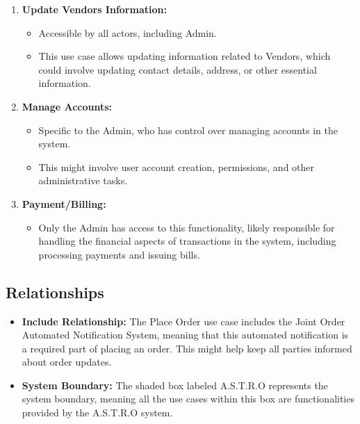\begin{enumerate}
    \item \textbf{Update Vendors Information:}
          \begin{itemize}
              \item Accessible by all actors, including Admin.
              \item This use case allows updating information related to Vendors, which could involve updating contact details, address, or other essential information.
          \end{itemize}

    \item \textbf{Manage Accounts:}
          \begin{itemize}
              \item Specific to the Admin, who has control over managing accounts in the system.
              \item This might involve user account creation, permissions, and other administrative tasks.
          \end{itemize}

    \item \textbf{Payment/Billing:}
          \begin{itemize}
              \item Only the Admin has access to this functionality, likely responsible for handling the financial aspects of transactions in the system, including processing payments and issuing bills.
          \end{itemize}
\end{enumerate}
\subsection{Relationships}

\begin{itemize}
    \item \textbf{Include Relationship:}
          The Place Order use case includes the Joint Order Automated Notification System, meaning that this automated notification is a required part of placing an order. This might help keep all parties informed about order updates.


    \item \textbf{System Boundary:}
          The shaded box labeled A.S.T.R.O represents the system boundary, meaning all the use cases within this box are functionalities provided by the A.S.T.R.O system.

\end{itemize}